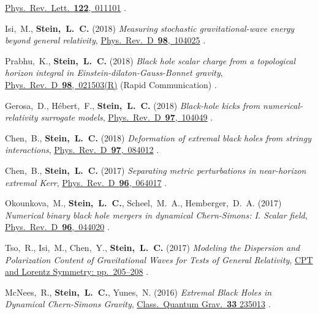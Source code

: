\begin{etaremune}[start=\value{pubCounter}]
  \href{https://doi.org/10.1103/PhysRevLett.122.011101}{Phys.~Rev.~Lett.~{\bf 122},~011101}
  .
\item
  Isi,~M., {\bf Stein,~L.~C.}
  (2018)
  {\it Measuring stochastic gravitational-wave energy beyond general relativity},
  \href{https://doi.org/10.1103/PhysRevD.98.104025}{Phys.~Rev.~D~{\bf 98},~104025}
  .
\item
  Prabhu,~K., {\bf Stein,~L.~C.}
  (2018)
  {\it Black hole scalar charge from a topological horizon integral in
    Einstein-dilaton-Gauss-Bonnet gravity},
  \href{https://doi.org/10.1103/PhysRevD.98.021503}{Phys.~Rev.~D~{\bf 98},~021503(R)}
  (Rapid Communication)
  .
\item
  Gerosa,~D., H\'ebert,~F., {\bf Stein,~L.~C.}
  (2018)
  {\it Black-hole kicks from numerical-relativity surrogate models},
  \href{https://doi.org/10.1103/PhysRevD.97.104049}{Phys.~Rev.~D~{\bf 97},~104049}
  .
\item
  Chen,~B., {\bf Stein,~L.~C.}
  (2018)
  {\it Deformation of extremal black holes from stringy interactions},
  \href{https://doi.org/10.1103/PhysRevD.97.084012}{Phys.~Rev.~D~{\bf 97},~084012}
  .
\item
  Chen,~B., {\bf Stein,~L.~C.}
  (2017)
  {\it Separating metric perturbations in near-horizon extremal Kerr},
  \href{https://doi.org/10.1103/PhysRevD.96.064017}{Phys.~Rev.~D~{\bf 96},~064017}
  .
\item
  Okounkova,~M.,
  {\bf Stein,~L.~C.},
  Scheel,~M.~A.,
  Hemberger,~D.~A.
  (2017)
  {\it Numerical binary black hole mergers in dynamical Chern-Simons:
    I. Scalar field},
  \href{https://doi.org/10.1103/PhysRevD.96.044020}{Phys.~Rev.~D~{\bf 96},~044020}
  .
\item
  Tso,~R., Isi,~M., Chen,~Y., {\bf Stein,~L.~C.}
  (2017)
  {\it Modeling the Dispersion and Polarization Content of
    Gravitational Waves for Tests of General Relativity},
  \href{http://dx.doi.org/10.1142/9789813148505_0052}{CPT and Lorentz Symmetry: pp.~205--208}
  .
\item
  McNees,~R., {\bf Stein,~L.~C.}, Yunes,~N.
  (2016)
  {\it Extremal Black Holes in Dynamical Chern-Simons Gravity},
  \href{http://dx.doi.org/10.1088/0264-9381/33/23/235013}{Class.~Quantum Grav.~{\bf 33} 235013}
  .

\end{etaremune}
